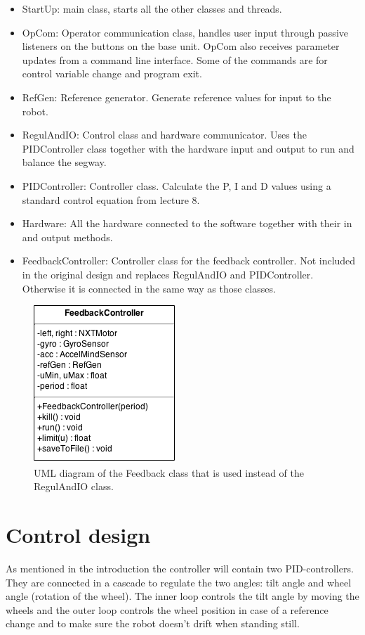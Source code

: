 \documentclass[a4paper]{article}
\begin{document}
\begin{itemize}
\item StartUp: main class, starts all the other classes and threads.
\item OpCom: Operator communication class, handles user input through passive listeners on the buttons on the base unit. OpCom also receives parameter updates from a command line interface. Some of the commands are for control variable change and program exit.
\item RefGen: Reference generator. Generate reference values for input to the robot.
\item RegulAndIO: Control class and hardware communicator. Uses the PIDController class together with the hardware input and output to run and balance the segway.
\item PIDController: Controller class. Calculate the P, I and D values using a standard control equation from lecture 8\cite{L8}.
\item Hardware: All the hardware connected to the software together with their in and output methods.
\item FeedbackController: Controller class for the feedback controller. Not included in the original design and replaces RegulAndIO and PIDController. Otherwise it is connected in the same way as those classes.
\end{itemize}

\begin{figure}[H]
 \centering
\includegraphics[scale=0.8]{pic/OnlyFeedback.png}
\caption{UML diagram of the Feedback class that is used instead of the RegulAndIO class.}
\end{figure}

\section{Control design}
As mentioned in the introduction the controller will contain two PID-controllers. They are connected in a cascade to regulate the two angles: tilt angle and wheel angle (rotation of the wheel). The inner loop controls the tilt angle by moving the wheels and the outer loop controls the wheel position in case of a reference change and to make sure the robot doesn't drift when standing still.
\end{document}
